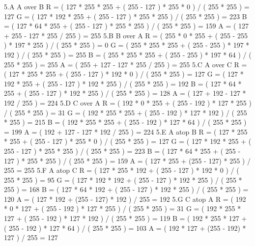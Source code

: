 \documentclass[11pt]{article}
\begin{document}
5.A   A over B
	R = ( 127 * 255 * 255 + ( 255 - 127 ) * 255 * 0    ) / ( 255 * 255 ) = 127
	G = ( 127 * 192 * 255 + ( 255 - 127 ) * 255 * 255  ) / ( 255 * 255 ) = 223
	B = ( 127 * 64  * 255 + ( 255 - 127 ) * 255 * 255  ) / ( 255 * 255 ) = 159
	A = ( 127 + 255 - 127 * 255 / 255 ) = 255
5.B   B over A
	R = ( 255 * 0   * 255 + ( 255 - 255 ) * 197 * 255  ) / ( 255 * 255 ) = 0
	G = ( 255 * 255 * 255 + ( 255 - 255 ) * 197 * 192  ) / ( 255 * 255 ) = 255
	B = ( 255 * 255 * 255 + ( 255 - 255 ) * 197 * 64   ) / ( 255 * 255 ) = 255
	A = ( 255 + 127 - 127 * 255 / 255 ) = 255
5.C   A over C
	R = ( 127 * 255 * 255 + ( 255 - 127 ) * 192 * 0    ) / ( 255 * 255 ) = 127
	G = ( 127 * 192 * 255 + ( 255 - 127 ) * 192 * 255  ) / ( 255 * 255 ) = 192
	B = ( 127 * 64  * 255 + ( 255 - 127 ) * 192 * 255  ) / ( 255 * 255 ) = 128
	A = ( 127 + 192 - 127 * 192 / 255 ) = 224
5.D   C over A
	R = ( 192 * 0   * 255 + ( 255 - 192 ) * 127 * 255  ) / ( 255 * 255 ) = 31
	G = ( 192 * 255 * 255 + ( 255 - 192 ) * 127 * 192  ) / ( 255 * 255 ) = 215
	B = ( 192 * 255 * 255 + ( 255 - 192 ) * 127 * 64   ) / ( 255 * 255 ) = 199
	A = ( 192 + 127 - 127 * 192 / 255 ) = 224
5.E   A atop B
	R = ( 127 * 255 * 255 + ( 255 - 127 ) * 255 * 0    ) / ( 255 * 255 ) = 127
	G = ( 127 * 192 * 255 + ( 255 - 127 ) * 255 * 255  ) / ( 255 * 255 ) = 223
	B = ( 127 * 64  * 255 + ( 255 - 127 ) * 255 * 255  ) / ( 255 * 255 ) = 159
	A = ( 127 * 255 + (255 - 127) * 255 ) / 255 = 255
5.F   A atop C
	R = ( 127 * 255 * 192 + ( 255 - 127 ) * 192 * 0    ) / ( 255 * 255 ) = 95
	G = ( 127 * 192 * 192 + ( 255 - 127 ) * 192 * 255  ) / ( 255 * 255 ) = 168
	B = ( 127 * 64  * 192 + ( 255 - 127 ) * 192 * 255  ) / ( 255 * 255 ) = 120
	A = ( 127 * 192 + (255 - 127) * 192 ) / 255 = 192
5.G   C atop A
	R = ( 192 * 0   * 127 + ( 255 - 192 ) * 127 * 255  ) / ( 255 * 255 ) = 31
	G = ( 192 * 255 * 127 + ( 255 - 192 ) * 127 * 192  ) / ( 255 * 255 ) = 119
	B = ( 192 * 255 * 127 + ( 255 - 192 ) * 127 * 64   ) / ( 255 * 255 ) = 103
	A = ( 192 * 127 + (255 - 192) * 127 ) / 255 = 127
\end{document}
